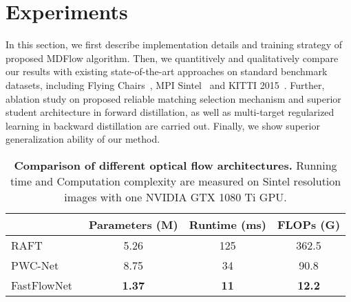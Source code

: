 \documentclass[lettersize,journal]{IEEEtran}
\begin{document}
\section{Experiments} \label{Experiments}
In this section, we first describe implementation details and training strategy of proposed MDFlow algorithm. Then, we quantitively and qualitatively compare our results with existing state-of-the-art approaches on standard benchmark datasets, including Flying Chairs~\cite{7410673}, MPI Sintel~\cite{Butler:ECCV:2012} and KITTI 2015~\cite{Menze2015CVPR}. Further, ablation study on proposed reliable matching selection mechanism and superior student architecture in forward distillation, as well as multi-target regularized learning in backward distillation are carried out. Finally, we show superior generalization ability of our method.

\begin{table}[t]
	\centering
	\renewcommand{\arraystretch}{1.1}
	\tabcolsep=2.4mm
	\caption{\textbf{Comparison of different optical flow architectures.} Running time and Computation complexity are measured on Sintel resolution images with one NVIDIA GTX 1080 Ti GPU.}
	\begin{tabular}{l|ccc}
		\toprule
		& Parameters (M) &  Runtime (ms) &  FLOPs (G) \\
		\midrule
		RAFT~\cite{teed2020raft} & 5.26 & 125 & 362.5 \\
		PWC-Net~\cite{8579029} & 8.75 & 34 & 90.8 \\
		FastFlowNet~\cite{Kong_2021_ICRA} & \textbf{1.37} & \textbf{11} & \textbf{12.2} \\
		\bottomrule
	\end{tabular}
	\label{tab:2}
\end{table}
\end{document}
